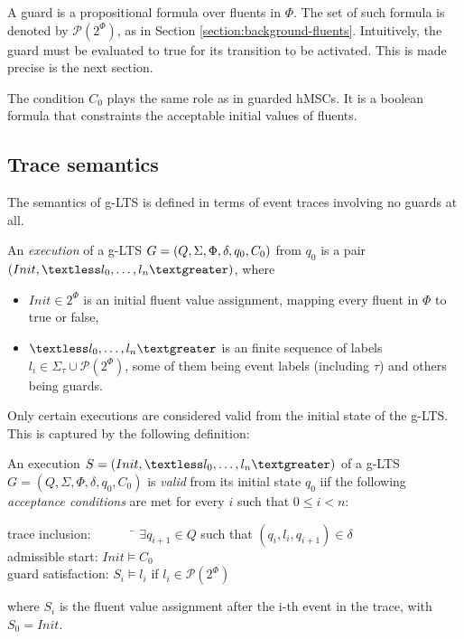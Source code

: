 A guard is a propositional formula over fluents in $\Phi$. The set of such formula is denoted by $\mathcal{P}(2^\Phi)$, as in Section \ref{section:background-fluents}. Intuitively, the guard must be evaluated to true for its transition to be activated. This is made precise is the next section.

The condition $C_0$ plays the same role as in guarded hMSCs. It is a boolean formula that constraints the acceptable initial values of fluents. 

\subsection{Trace semantics\label{subsection:glts-trace-semantics}} 

The semantics of g-LTS is defined in terms of event traces involving no guards at all.

\begin{definition}
An \emph{execution} of a g-LTS $G = (Q,\Sigma,\Phi,\\\delta,q_{0},C_{0})$ from $q_0$ is a pair $(Init, \textless l_0, \ldots,l_n\textgreater)$, where 
\begin{itemize}
\item $Init \in 2^\Phi$ is an initial fluent value assignment, mapping every fluent in $\Phi$ to true or false,
\item $\textless l_0,\ldots,l_n \textgreater$ is an finite sequence of labels $l_i \in \Sigma_{\tau}\cup\mathcal{P}(2^\Phi)$, some of them being event labels (including $\tau$) and others being guards.
\end{itemize}
\end{definition}

Only certain executions are considered valid from the initial state of the g-LTS. This is captured by the following definition:

\begin{definition}
An execution $S = (Init,\textless l_0,\ldots,l_n\textgreater)$ of a g-LTS $G = (Q,\Sigma,\Phi,\delta,q_{0},C_{0})$ is \emph{valid} from its initial state $q_0$ iif the following \emph{acceptance conditions} are met for every $i$ such that $0 \leqslant i < n$:\\
\vspace{-0.8cm}
\begin{tabbing}
\indent trace inclusion:~~~~~~~\= $\exists q_{i+1} \in Q$ such that $(q_i,l_i,q_{i+1}) \in \delta$\\
\indent admissible start:      \> $Init \models C_0$ \\
\indent guard satisfaction:    \> $S_i \models l_i$ if $l_i \in \mathcal{P}(2^\Phi)$\\
\end{tabbing}
\vspace{-0.8cm}
where $S_i$ is the fluent value assignment after the i-th event in the trace, with $S_0 = Init$.
\end{definition}

